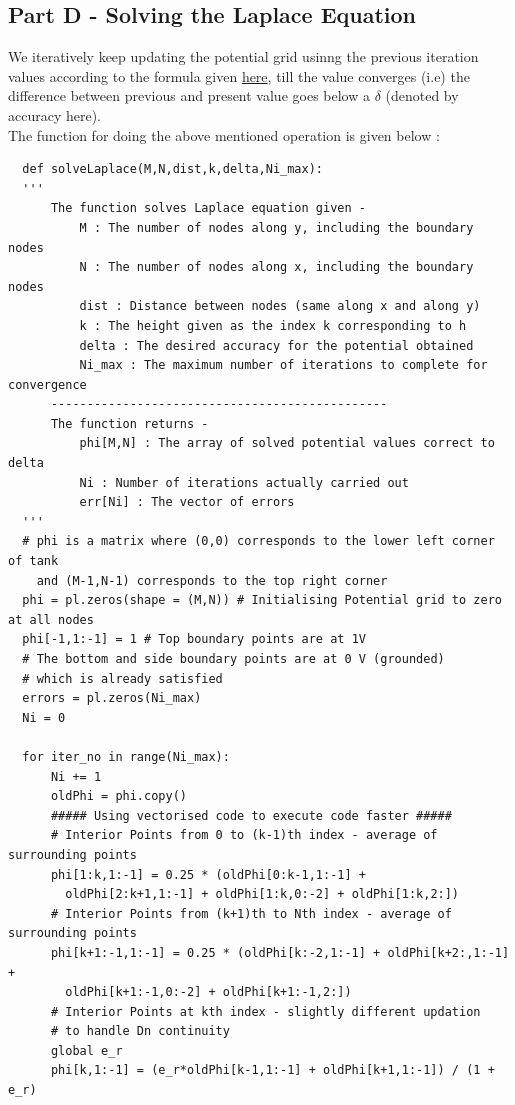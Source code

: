 \documentclass[11pt, a4paper]{article}
\begin{document}
\subsection{Part D - Solving the Laplace Equation}
We iteratively keep updating the potential grid usinng the previous iteration values according to the formula given \hyperref[eq:1]{here},
till the value converges (i.e) the difference between previous and present value goes below a $\delta$ (denoted by accuracy here).
\\ The function for doing the above mentioned operation is given below :
\\
\begin{verbatim}
  def solveLaplace(M,N,dist,k,delta,Ni_max):
  ''' 
      The function solves Laplace equation given -
          M : The number of nodes along y, including the boundary nodes
          N : The number of nodes along x, including the boundary nodes
          dist : Distance between nodes (same along x and along y)
          k : The height given as the index k corresponding to h
          delta : The desired accuracy for the potential obtained
          Ni_max : The maximum number of iterations to complete for convergence
      -----------------------------------------------
      The function returns -
          phi[M,N] : The array of solved potential values correct to delta
          Ni : Number of iterations actually carried out
          err[Ni] : The vector of errors
  '''
  # phi is a matrix where (0,0) corresponds to the lower left corner of tank 
    and (M-1,N-1) corresponds to the top right corner
  phi = pl.zeros(shape = (M,N)) # Initialising Potential grid to zero at all nodes
  phi[-1,1:-1] = 1 # Top boundary points are at 1V
  # The bottom and side boundary points are at 0 V (grounded)
  # which is already satisfied
  errors = pl.zeros(Ni_max)
  Ni = 0

  for iter_no in range(Ni_max):
      Ni += 1
      oldPhi = phi.copy()
      ##### Using vectorised code to execute code faster #####
      # Interior Points from 0 to (k-1)th index - average of surrounding points
      phi[1:k,1:-1] = 0.25 * (oldPhi[0:k-1,1:-1] + 
        oldPhi[2:k+1,1:-1] + oldPhi[1:k,0:-2] + oldPhi[1:k,2:])
      # Interior Points from (k+1)th to Nth index - average of surrounding points
      phi[k+1:-1,1:-1] = 0.25 * (oldPhi[k:-2,1:-1] + oldPhi[k+2:,1:-1] +
        oldPhi[k+1:-1,0:-2] + oldPhi[k+1:-1,2:])
      # Interior Points at kth index - slightly different updation 
      # to handle Dn continuity
      global e_r
      phi[k,1:-1] = (e_r*oldPhi[k-1,1:-1] + oldPhi[k+1,1:-1]) / (1 + e_r)


\end{verbatim}
\end{document}
